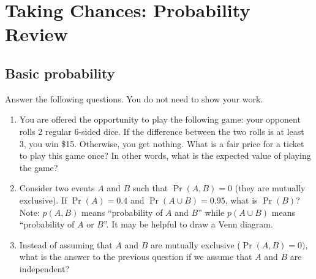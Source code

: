 \newpage

\section{Taking Chances: Probability Review}





\subsection{Basic probability}
Answer the following questions. You do not need to show your work.

\begin{enumerate}
    \item You are offered the opportunity to play the following game: your opponent rolls 2 regular 6-sided dice. If the difference between the two rolls is at least 3, you win \$15. Otherwise, you get nothing. What is a fair price for a ticket to play this game once? In other words, what is the expected value of playing the game?
    
    \item Consider two events $A$ and $B$ such that $\Pr(A, B)=0$ (they are mutually exclusive). If $\Pr(A) = 0.4$ and $\Pr(A \cup B) = 0.95$, what is $\Pr(B)$? Note: $p(A, B)$ means ``probability of $A$ and $B$'' while $p(A \cup B)$ means ``probability of $A$ or $B$''. It may be helpful to draw a Venn diagram.
    
    \item Instead of assuming that $A$ and $B$ are mutually exclusive ($\Pr(A,B) = 0)$, what is the answer to the previous question if we assume that $A$ and $B$ are independent?
\end{enumerate}


